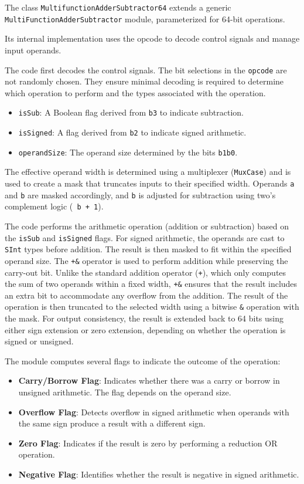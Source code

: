 {The class \texttt{MultifunctionAdderSubtractor64} extends a generic \texttt{MultiFunctionAdderSubtractor} module, parameterized for 64-bit operations. 

Its internal implementation uses the opcode to decode control signals and manage input operands.

The code first decodes the control signals. The bit selections in the \texttt{opcode} are not randomly chosen. They ensure minimal decoding is required to determine which operation to perform and the types associated with the operation.
\begin{itemize}
    \item \texttt{isSub}: A Boolean flag derived from \texttt{b3} to indicate subtraction.
    \item \texttt{isSigned}: A flag derived from \texttt{b2} to indicate signed arithmetic.
    \item \texttt{operandSize}: The operand size determined by the bits \texttt{b1b0}.
\end{itemize}

The effective operand width is determined using a multiplexer (\texttt{MuxCase}) and is used to create a mask that truncates inputs to their specified width. Operands \texttt{a} and \texttt{b} are masked accordingly, and \texttt{b} is adjusted for subtraction using two's complement logic (\texttt{~b + 1}).

The code performs the arithmetic operation (addition or subtraction) based on the \texttt{isSub} and \texttt{isSigned} flags. For signed arithmetic, the operands are cast to \texttt{SInt} types before addition. The result is then masked to fit within the specified operand size. The \texttt{+\&} operator is used to perform addition while preserving the carry-out bit. Unlike the standard addition operator (\texttt{+}), which only computes the sum of two operands within a fixed width, \texttt{+\&} ensures that the result includes an extra bit to accommodate any overflow from the addition. The result of the operation is then truncated to the selected width using a bitwise \texttt{\&} operation with the mask. For output consistency, the result is extended back to 64 bits using either sign extension or zero extension, depending on whether the operation is signed or unsigned.

The module computes several flags to indicate the outcome of the operation:
\begin{itemize}
    \item \textbf{Carry/Borrow Flag}: Indicates whether there was a carry or borrow in unsigned arithmetic. The flag depends on the operand size.
    \item \textbf{Overflow Flag}: Detects overflow in signed arithmetic when operands with the same sign produce a result with a different sign.
    \item \textbf{Zero Flag}: Indicates if the result is zero by performing a reduction OR operation.
    \item \textbf{Negative Flag}: Identifies whether the result is negative in signed arithmetic.
\end{itemize}

}
